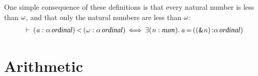 \documentclass[11pt]{llncs}
\renewcommand{\HOLConst}[1]{{\textsf{\upshape\small #1}}}
\renewcommand{\HOLTyOp}[1]{\mbox{\fontencoding{T1}\fontfamily{bch}\fontseries{m}\fontshape{it}\fontsize{9.5}{10}\selectfont #1}}
\renewcommand{\HOLinline}[1]{\ensuremath{#1}}
\newenvironment{holmath}{\begin{displaymath}\begin{array}{l}}{\end{array}\end{displaymath}\ignorespacesafterend}
\begin{document}
\begin{theorem}
\label{thm:lt-omega}
One simple consequence of these definitions is that every natural number is less than \HOLinline{\HOLConst{\ensuremath{\omega}}}, and that only the natural numbers are less than \HOLinline{\HOLConst{\ensuremath{\omega}}}:
\begin{holmath}
\HOLTokenTurnstile{}\,(\HOLFreeVar{a} :\ensuremath{\alpha}\,\HOLTyOp{ordinal})\,\ensuremath{{<}}\,(\HOLConst{\ensuremath{\omega}} :\ensuremath{\alpha}\,\HOLTyOp{ordinal})\,\ensuremath{{\iff}}\,\ensuremath{{\exists}}(\HOLBoundVar{n} :\HOLTyOp{num})\ensuremath{.}\,\HOLFreeVar{a}\,{\ensuremath{=}}\,((\HOLConst{\&}\HOLBoundVar{n})\,\ensuremath{{:}}\ensuremath{\alpha}\,\HOLTyOp{ordinal})
\end{holmath}
\end{theorem}

\section{Arithmetic}
\label{sec:arithmetic}
\end{document}
